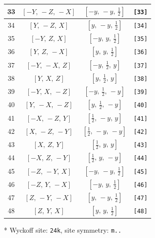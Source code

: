 \documentclass[fleqn,8pt]{jsarticle}
\begin{document}
\begin{longtable}{cccc}
33 & $\left[ - Y,\, - Z,\, - X \right]$ & $\left[ - y,\, - y,\, \frac{1}{2} \right]$ & {\tt [33]} \\ \hline
34 & $\left[ Y,\, - Z,\, X \right]$ & $\left[ y,\, - y,\, \frac{1}{2} \right]$ & {\tt [34]} \\ \hline
35 & $\left[ - Y,\, Z,\, X \right]$ & $\left[ - y,\, y,\, \frac{1}{2} \right]$ & {\tt [35]} \\ \hline
36 & $\left[ Y,\, Z,\, - X \right]$ & $\left[ y,\, y,\, \frac{1}{2} \right]$ & {\tt [36]} \\ \hline
37 & $\left[ - Y,\, - X,\, Z \right]$ & $\left[ - y,\, \frac{1}{2},\, y \right]$ & {\tt [37]} \\ \hline
38 & $\left[ Y,\, X,\, Z \right]$ & $\left[ y,\, \frac{1}{2},\, y \right]$ & {\tt [38]} \\ \hline
39 & $\left[ - Y,\, X,\, - Z \right]$ & $\left[ - y,\, \frac{1}{2},\, - y \right]$ & {\tt [39]} \\ \hline
40 & $\left[ Y,\, - X,\, - Z \right]$ & $\left[ y,\, \frac{1}{2},\, - y \right]$ & {\tt [40]} \\ \hline
41 & $\left[ - X,\, - Z,\, Y \right]$ & $\left[ \frac{1}{2},\, - y,\, y \right]$ & {\tt [41]} \\ \hline
42 & $\left[ X,\, - Z,\, - Y \right]$ & $\left[ \frac{1}{2},\, - y,\, - y \right]$ & {\tt [42]} \\ \hline
43 & $\left[ X,\, Z,\, Y \right]$ & $\left[ \frac{1}{2},\, y,\, y \right]$ & {\tt [43]} \\ \hline
44 & $\left[ - X,\, Z,\, - Y \right]$ & $\left[ \frac{1}{2},\, y,\, - y \right]$ & {\tt [44]} \\ \hline
45 & $\left[ - Z,\, - Y,\, X \right]$ & $\left[ - y,\, - y,\, \frac{1}{2} \right]$ & {\tt [45]} \\ \hline
46 & $\left[ - Z,\, Y,\, - X \right]$ & $\left[ - y,\, y,\, \frac{1}{2} \right]$ & {\tt [46]} \\ \hline
47 & $\left[ Z,\, - Y,\, - X \right]$ & $\left[ y,\, - y,\, \frac{1}{2} \right]$ & {\tt [47]} \\ \hline
48 & $\left[ Z,\, Y,\, X \right]$ & $\left[ y,\, y,\, \frac{1}{2} \right]$ & {\tt [48]} \\
\end{longtable}
* Wyckoff site: {\tt 24k}, site symmetry: {\tt m..}
\renewcommand{\arraystretch}{1.2}
\end{document}
